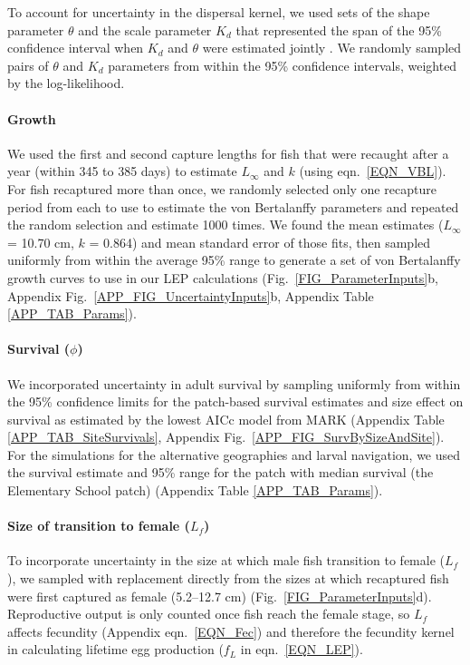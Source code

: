 \documentclass[12pt, oneside]{article}   	%
\begin{document}
To account for uncertainty in the dispersal kernel, we used sets of the shape parameter $\theta$ and the scale parameter $K_d$ that represented the span of the 95\% confidence interval when $K_d$ and $\theta$ were estimated jointly \citep[Appendix Table \ref{APP_TAB_Params}, Fig.\ \ref{FIG_ParameterInputs}a,][]{catalanoInPrepconnectivity}. We randomly sampled pairs of $\theta$ and $K_d$ parameters from within the 95\% confidence intervals, weighted by the log-likelihood. 

\paragraph*{Growth} 

We used the first and second capture lengths for fish that were recaught after a year (within 345 to 385 days) to estimate $L_\infty$ and $k$ (using eqn.\ \ref{EQN_VBL}). For fish recaptured more than once, we randomly selected only one recapture period from each to use to estimate the von Bertalanffy parameters and repeated the random selection and estimate 1000 times. We found the mean estimates ($L_\infty$ = 10.70 cm, $k$ = 0.864) and mean standard error of those fits, then sampled uniformly from within the average 95\% range to generate a set of von Bertalanffy growth curves to use in our LEP calculations (Fig.\ \ref{FIG_ParameterInputs}b, Appendix Fig.\ \ref{APP_FIG_UncertaintyInputs}b, Appendix Table \ref{APP_TAB_Params}).

\paragraph*{Survival ($\phi$)} 

We incorporated uncertainty in adult survival by sampling uniformly from within the 95\% confidence limits for the patch-based survival estimates and size effect on survival as estimated by the lowest AICc model from MARK (Appendix Table \ref{APP_TAB_SiteSurvivals}, Appendix Fig.\ \ref{APP_FIG_SurvBySizeAndSite}). For the simulations for the alternative geographies and larval navigation, we used the survival estimate and 95\% range for the patch with median survival (the Elementary School patch) (Appendix Table \ref{APP_TAB_Params}). 

\paragraph*{Size of transition to female ($L_f$)} 

To incorporate uncertainty in the size at which male fish transition to female ($L_f$), we sampled with replacement directly from the sizes at which recaptured fish were first captured as female (5.2--12.7 cm) (Fig.\ \ref{FIG_ParameterInputs}d). Reproductive output is only counted once fish reach the female stage, so $L_f$ affects fecundity (Appendix eqn.\ \ref{EQN_Fec}) and therefore the fecundity kernel in calculating lifetime egg production ($f_L$ in eqn.\ \ref{EQN_LEP}).
\end{document}
